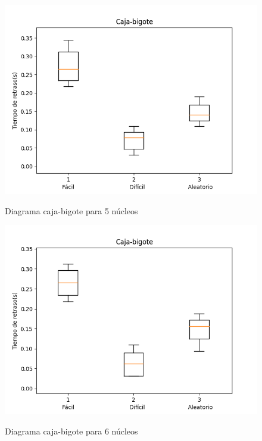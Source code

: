 \documentclass[a4paper, 11pt]{article}
\begin{document}
\begin{figure}[H]
  \centering      
  \caption{Diagrama caja-bigote para 5 núcleos}  
  \includegraphics[scale=.6]{CB_5núcleos.png}
  \label{f5}
\end{figure}
\begin{figure}[H]
  \centering      
  \caption{Diagrama caja-bigote para 6 núcleos}  
  \includegraphics[scale=.6]{CB_6núcleos.png}
  \label{f6}
\end{figure}
\end{document}
